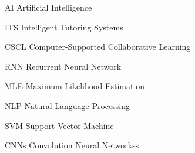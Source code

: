 \documentclass[letterpaper%
, twoside%
, 12pt%
,these%
, english%
,creativecommons,hyperref, withAlgo2e %
]{thETS}
\begin{document}
\begin{listofabbr}[3cm]
\item [AI] Artificial Intelligence
\item [ITS] Intelligent Tutoring Systems
\item [CSCL]  Computer-Supported Collaborative Learning
\item [RNN] Recurrent Neural Network 
\item [MLE] Maximum Likelihood Estimation
\item [NLP] Natural Language Processing
\item [SVM] Support Vector Machine
\item [CNNs] Convolution Neural Networkss

\end{listofabbr}






\cleardoublepage


\reversemarginpar

\end{document}
